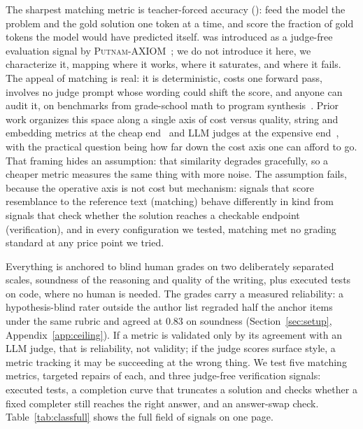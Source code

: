 The sharpest matching metric is teacher-forced accuracy (\tfa): feed the model the problem and the gold solution one token at a time, and score the fraction of gold tokens the model would have predicted itself.
\tfa{} was introduced as a judge-free evaluation signal by \textsc{Putnam-AXIOM}~\cite{gulati2025putnam}; we do not introduce it here, we characterize it, mapping where it works, where it saturates, and where it fails.
The appeal of matching is real: it is deterministic, costs one forward pass, involves no judge prompt whose wording could shift the score, and anyone can audit it, on benchmarks from grade-school math to program synthesis~\cite{cobbe2021gsm8k,hendrycks2021math,chen2021codex}.
Prior work organizes this space along a single axis of cost versus quality, string and embedding metrics at the cheap end~\cite{yuan2021bartscore} and LLM judges at the expensive end~\cite{zheng2023judging}, with the practical question being how far down the cost axis one can afford to go.
That framing hides an assumption: that similarity degrades gracefully, so a cheaper metric measures the same thing with more noise.
The assumption fails, because the operative axis is not cost but mechanism: signals that score resemblance to the reference text (matching) behave differently in kind from signals that check whether the solution reaches a checkable endpoint (verification), and in every configuration we tested, matching met no grading standard at any price point we tried.

Everything is anchored to blind human grades on two deliberately separated scales, soundness of the reasoning and quality of the writing, plus executed tests on code, where no human is needed.
The grades carry a measured reliability: a hypothesis-blind rater outside the author list regraded half the anchor items under the same rubric and agreed at $0.83$ on soundness (Section~\ref{sec:setup}, Appendix~\ref{app:ceiling}).
If a metric is validated only by its agreement with an LLM judge, that is reliability, not validity; if the judge scores surface style, a metric tracking it may be succeeding at the wrong thing.
We test five matching metrics, targeted repairs of each, and three judge-free verification signals: executed tests, a completion curve that truncates a solution and checks whether a fixed completer still reaches the right answer, and an answer-swap check.
Table~\ref{tab:classfull} shows the full field of signals on one page.


